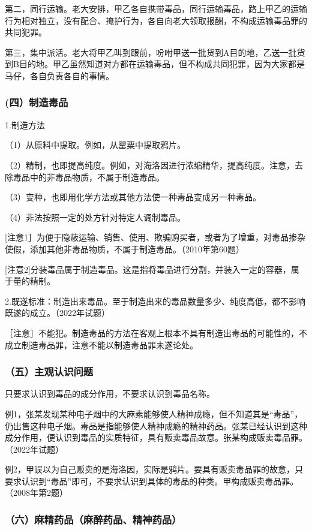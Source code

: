 第二，同行运输。老大安排，甲乙各自携带毒品，同行运输毒品，路上甲乙的运输行为相对独立，没有配合、掩护行为，各自向老大领取报酬，不构成运输毒品罪的共同犯罪。

第三，集中派活。老大将甲乙叫到跟前，吩咐甲送一批货到A目的地，乙送一批货到B目的地。甲乙虽然知道对方都在运输毒品，但不构成共同犯罪，因为大家都是马仔，各自负责各自的事情。

\subsubsection*{(四）制造毒品}

1.制造方法

（1）从原料中提取。例如，从罂粟中提取鸦片。

（2）精制，也即提高纯度。例如，对海洛因进行浓缩精华，提高纯度。注意，去除毒品中的非毒品物质，不属于制造毒品。

（3）变种，也即用化学方法或其他方法使一种毒品变成另一种毒品。

（4）非法按照一定的处方针对特定人调制毒品。

[注意1］为便于隐蔽运输、销售、使用、欺骗购买者，或者为了增重，对毒品掺杂使假，添加其他非毒品物质，不属于制造毒品。（2010年第60题）

[注意2]分装毒品属于制造毒品。这是指将毒品进行分割，并装入一定的容器，属于量的精制。

2.既遂标准：制造出来毒品。至于制造出来的毒品数量多少、纯度高低，都不影响既遂的成立。（2022年试题）

［注意］不能犯。制造毒品的方法在客观上根本不具有制造出毒品的可能性的，不成立制造毒品罪，注意不能以制造毒品罪未遂论处。

\subsubsection*{（五）主观认识问题}

只要求认识到毒品的成分作用，不要求认识到毒品名称。

例1，张某发现某种电子烟中的大麻素能够使人精神成瘾，但不知道其是“毒品”，仍出售这种电子烟。毒品是指能够使人精神成瘾的精神药品。张某已经认识到这种成分作用，便认识到毒品的实质特征，具有贩卖毒品故意。张某构成贩卖毒品罪。（2022年试题）

例2，甲误以为自己贩卖的是海洛因，实际是鸦片。要具有贩卖毒品罪的故意，只要求认识到“毒品”即可，不要求认识到具体的毒品的种类。甲构成贩卖毒品罪。（2008年第2题）

\subsubsection*{（六）麻精药品（麻醉药品、精神药品）\protect\footnotemark}

